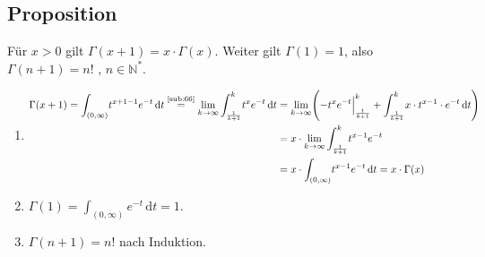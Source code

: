 \subsection[Proposition: Rekursionsformel der Gammafunktion]{Proposition} %
\label{sub:77}
Für $x>0$ gilt $\Gamma(x+1)= x \cdot \Gamma(x)$. Weiter gilt $\Gamma(1)=1$, also $\Gamma(n+1)= n!$ , $n \in \mathds{N}^*$.
\begin{enumerate}[1.)]
	\item \begin{align*}
		\Gamma(x+1) = \int_{(0,\infty)}\! t^{x+1-1} e^{-t}  \, \mathrm{d}t \stackrel{\text{\ref{sub:66}}}{=} \lim_{ k \to \infty} \int_{\frac{1}{k+1} } ^{k} \! 
		t^{x} e^{-t}  \, \mathrm{d}t &= \lim_{ k \to \infty} \enbrace*{-t^x e^{-t} \Big|_{\frac{1}{k+1} }^k + \int_{\frac{1}{k+1} } ^{k} \! x \cdot t^{x-1} 
		\cdot e^{-t}  \, \mathrm{d}t} \\
		&= x \cdot \lim_{ k \to \infty} \int_{\frac{1}{k+1} } ^{k} \! t^{x-1} e^{-t}\\
		&= x \cdot \int_{(0,\infty)}\! t^{x-1} e^{-t}  \, \mathrm{d}t = x \cdot \Gamma(x)
	\end{align*}
	\item $\Gamma(1)= \int_{(0,\infty)}e^{-t}  \, \mathrm{d}t =1$.
	\item $\Gamma(n+1)=n!$ nach Induktion. \bewende
\end{enumerate}


